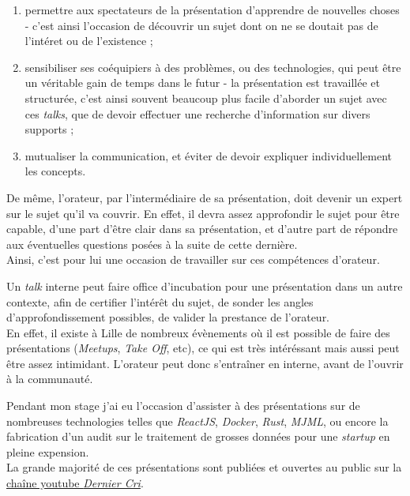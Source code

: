 \documentclass[12pt,a4paper]{article}
\providecommand{\tightlist}{%
  \setlength{\itemsep}{0pt}\setlength{\parskip}{0pt}}
\begin{document}
  \begin{enumerate}
  \def\labelenumi{\arabic{enumi}.}
  \tightlist
  \item
    permettre aux spectateurs de la présentation d'apprendre de nouvelles
    choses - c'est ainsi l'occasion de découvrir un sujet dont on ne se
    doutait pas de l'intéret ou de l'existence ;\\
  \item
    sensibiliser ses coéquipiers à des problèmes, ou des technologies, qui
    peut être un véritable gain de temps dans le futur - la présentation
    est travaillée et structurée, c'est ainsi souvent beaucoup plus facile
    d'aborder un sujet avec ces \emph{talks}, que de devoir effectuer une
    recherche d'information sur divers supports ;\\
  \item
    mutualiser la communication, et éviter de devoir expliquer
    individuellement les concepts.
  \end{enumerate}

  \bigskip

  De même, l'orateur, par l'intermédiaire de sa présentation, doit devenir
  un expert sur le sujet qu'il va couvrir. En effet, il devra assez
  approfondir le sujet pour être capable, d'une part d'être clair dans sa
  présentation, et d'autre part de répondre aux éventuelles questions
  posées à la suite de cette dernière.\\
  Ainsi, c'est pour lui une occasion de travailler sur ces compétences
  d'orateur.

  \bigskip

  Un \emph{talk} interne peut faire office d'incubation pour une
  présentation dans un autre contexte, afin de certifier l'intérêt du
  sujet, de sonder les angles d'approfondissement possibles, de valider la
  prestance de l'orateur.\\
  En effet, il existe à Lille de nombreux évènements où il est possible de
  faire des présentations (\emph{Meetups}, \emph{Take Off}, etc), ce qui
  est très intéréssant mais aussi peut être assez intimidant. L'orateur
  peut donc s'entraîner en interne, avant de l'ouvrir à la communauté.

  \bigskip

  Pendant mon stage j'ai eu l'occasion d'assister à des présentations sur
  de nombreuses technologies telles que \emph{ReactJS}, \emph{Docker},
  \emph{Rust}, \emph{MJML}, ou encore la fabrication d'un audit sur le
  traitement de grosses données pour une \emph{startup} en pleine
  expension.\\
  La grande majorité de ces présentations sont publiées et ouvertes au
  public sur la
  \href{https://www.youtube.com/channel/UCDfdBlzldhg_PEu3xZTPsHg}{chaîne
  youtube \emph{Dernier Cri}}.
\end{document}
